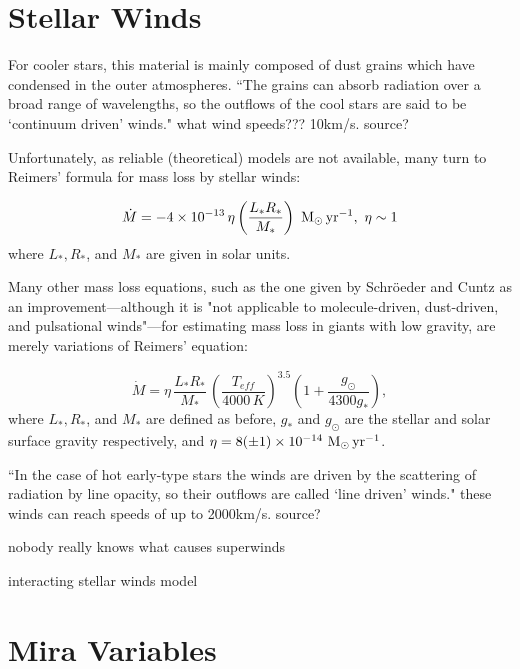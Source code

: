 \documentclass[a4paper,11pt,twocolumn]{article}
\begin{document}
\section{Stellar Winds}

For cooler stars, this material is mainly composed of dust grains which have condensed in the outer atmospheres. ``The grains can absorb radiation over a broad range of wavelengths, so the outflows of the cool stars are said to be ‘continuum driven’ winds." \cite{lamers} {\huge what wind speeds??? 10km/s. source?}

Unfortunately, as reliable (theoretical) models are not available, many turn to Reimers' formula \cite{reimers} for mass loss by stellar winds:

\begin{equation*}
    \dot M = -4\times 10^{-13}\,\eta \left(\frac{L_*R_*}{M_*}\right)~{\rm M_\odot\,yr^{-1}},~{\rm \eta \sim 1}
\end{equation*}
where $L_*, R_*$, and $M_*$ are given in solar units. 

Many other mass loss equations, such as the one given by Schröeder and Cuntz \cite{schroeder} as an improvement—although it is "not applicable to molecule-driven, dust-driven, and pulsational winds"—for estimating mass loss in giants with low gravity, are merely variations of Reimers' equation:

\begin{equation*}
    \dot M = \eta\,\frac{L_*R_*}{M_*}\,\left(\frac{T_{eff}}{4000\,K}\right)^{3.5}\left(1+\frac{g_\odot}{4300g_*}\right),
\end{equation*}
where $L_*, R_*$, and $M_*$ are defined as before, $g_*$ and $g_\odot$ are the stellar and solar surface gravity respectively, and $\eta = 8 (\pm 1) \times 10^{-14}~{\rm M_\odot\,yr^{-1}}$.





``In the case of hot early-type stars the winds are driven by the scattering of radiation by line opacity, so their outflows are called ‘line driven’ winds." \cite{lamers} {\huge these winds can reach speeds of up to 2000km/s. source?}

{\huge nobody really knows what causes superwinds}

{\huge interacting stellar winds model}


\section{Mira Variables}
\end{document}
